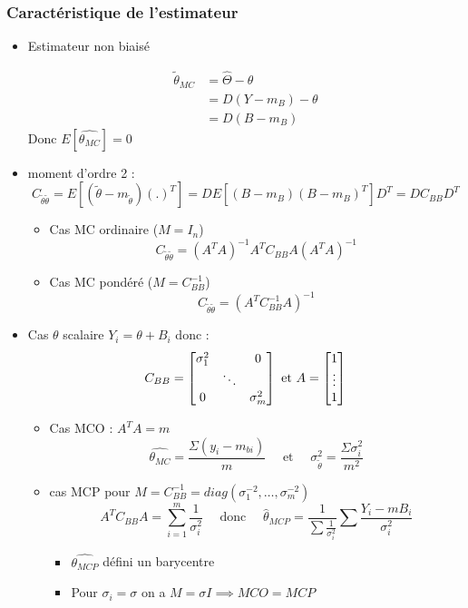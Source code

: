 \documentclass[main.tex]{subfiles}
\begin{document}
\subsubsection{Caractéristique de l'estimateur}
\begin{itemize}
\item Estimateur non biaisé

  \begin{align*}
    \tilde{\theta}_{MC} &=\hat{\Theta}-\theta\\
                   &= D(Y-m_B)-\theta \\
                   &= D(B-m_B)
  \end{align*}
Donc $E[\hat{\theta_{MC}}] = 0 $
\item moment d'ordre 2 :
  \[
      C_{\tilde{\theta}\tilde{\theta}} = E[(\tilde{\theta}-m_{\tilde{\theta}})(.)^T] = D E[(B-m_B)(B-m_B)^T]D^T = D C_{BB}D^T
    \]
    \begin{itemize}
    \item Cas MC ordinaire ($M=I_n$)
      \[
              C_{\tilde{\theta}\tilde{\theta}} = (A^TA)^{-1}A^TC_{BB}A(A^TA)^{-1}
      \]
    \item Cas MC pondéré ($M = C_{BB}^{-1}$)
      \[
        C_{\tilde{\theta}\tilde{\theta}} = (A^TC_{BB}^{-1}A)^{-1}
      \]
    \end{itemize}
  \item Cas $\theta$ scalaire $Y_i = \theta +B_i$ donc :
     \[
       C_{BB} =
       \begin{bmatrix}
         \sigma_1^2 &  &0 \\
         & \ddots &  \\
         0 & & \sigma_m^2
       \end{bmatrix} \text{ et }A = \begin{bmatrix} 1\\ \vdots \\ 1 \end{bmatrix}
     \]
     \begin{itemize}
     \item Cas MCO : $A^TA = m $
       \[
         \hat{\theta_{MC}} =\frac{\Sigma(y_i-m_{bi})}{m} \quad \text{ et } \quad \sigma_{\tilde{\theta}}^2 = \frac{\Sigma\sigma_i^2}{m^2}
       \]
     \item cas MCP pour $M = C_{BB}^{-1} = diag(\sigma_1^{-2}, \dots, \sigma_m^{-2})$
\[
  A^TC_{BB}A  = \sum_{i=1}^m \frac{1}{\sigma_i^2} \quad \text{ donc } \quad \hat{\theta}_{MCP} = \frac{1}{\sum \frac{1}{\sigma_i^2}}\sum_{}^{}\frac{Y_i-mB_i}{\sigma_i^2}
\]
\begin{itemize}
\item $\hat{\theta_{MCP}}$ défini un barycentre
\item Pour $\sigma_i = \sigma$ on a $M=\sigma I \implies MCO =MCP $
\end{itemize}


\end{itemize}
\end{itemize}
\end{document}
